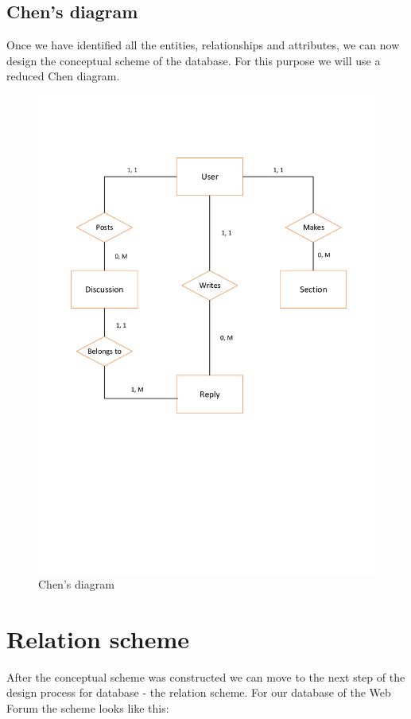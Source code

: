 \documentclass[12pt,a4paper]{amsart}
\begin{document}
{\subsection{Chen's diagram}
Once we have identified all the entities, relationships and attributes, we can now design the conceptual scheme of the database. For this purpose we will use a reduced Chen diagram. 

\begin{figure}[htbp]
\centerline{\includegraphics[scale=0.6]{Chen.pdf}}
\caption{Chen's diagram}
\label{fig1}
\end{figure}

\section{Relation scheme}
After the conceptual scheme was constructed we can move to the next step of the design process for database - the relation scheme. For our database of the Web Forum the scheme looks like this:\\
\vspace{2mm}

}
\end{document}

